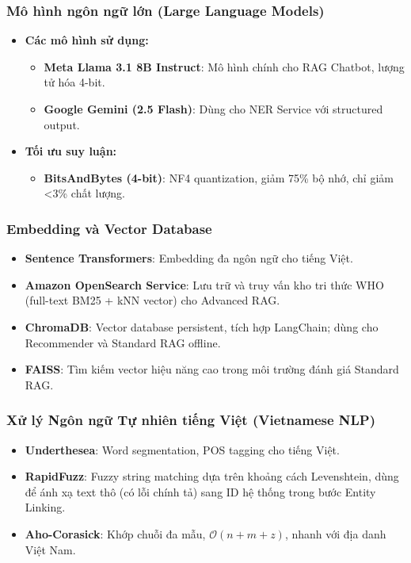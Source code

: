 \subsubsection{Mô hình ngôn ngữ lớn (Large Language Models)}
\begin{itemize}
    \item \textbf{Các mô hình sử dụng:}
    \begin{itemize}
        \item \textbf{Meta Llama 3.1 8B Instruct}: Mô hình chính cho RAG Chatbot, lượng tử hóa 4-bit.
        \item \textbf{Google Gemini (2.5 Flash)}: Dùng cho NER Service với structured output.
    \end{itemize}

    \item \textbf{Tối ưu suy luận:}
    \begin{itemize}
        \item \textbf{BitsAndBytes (4-bit)}: NF4 quantization, giảm 75\% bộ nhớ, chỉ giảm <3\% chất lượng.
    \end{itemize}
\end{itemize}

\subsubsection{Embedding và Vector Database}
\begin{itemize}
    \item \textbf{Sentence Transformers}: Embedding đa ngôn ngữ cho tiếng Việt.
    \item \textbf{Amazon OpenSearch Service}: Lưu trữ và truy vấn kho tri thức WHO (full-text BM25 + kNN vector) cho Advanced RAG.
    \item \textbf{ChromaDB}: Vector database persistent, tích hợp LangChain; dùng cho Recommender và Standard RAG offline.
    \item \textbf{FAISS}: Tìm kiếm vector hiệu năng cao trong môi trường đánh giá Standard RAG.
\end{itemize}

\subsubsection{Xử lý Ngôn ngữ Tự nhiên tiếng Việt (Vietnamese NLP)}
\begin{itemize}
    \item \textbf{Underthesea}: Word segmentation, POS tagging cho tiếng Việt.
    \item \textbf{RapidFuzz}: Fuzzy string matching dựa trên khoảng cách Levenshtein, dùng để ánh xạ text thô (có lỗi chính tả) sang ID hệ thống trong bước Entity Linking.
    \item \textbf{Aho-Corasick}: Khớp chuỗi đa mẫu, $\mathcal{O}(n + m + z)$, nhanh với địa danh Việt Nam.
\end{itemize}

